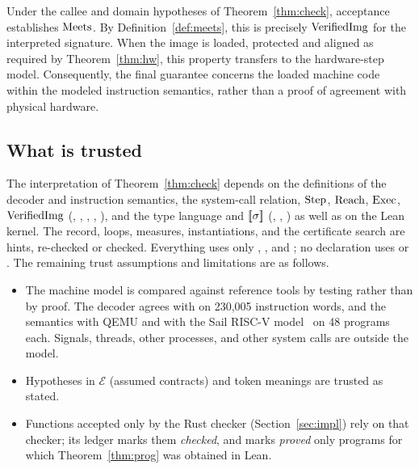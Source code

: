 Under the callee and domain hypotheses of Theorem~\ref{thm:check}, acceptance establishes $\mathrm{Meets}$. By Definition~\ref{def:meets}, this is precisely $\mathrm{VerifiedImg}$ for the interpreted signature. When the image is loaded, protected and aligned as required by Theorem~\ref{thm:hw}, this property transfers to the hardware-step model. Consequently, the final guarantee concerns the loaded machine code within the modeled instruction semantics, rather than a proof of agreement with physical hardware.

\subsection{What is trusted}
The interpretation of Theorem~\ref{thm:check} depends on the definitions of the decoder and instruction semantics, the system-call relation, $\mathrm{Step}$, $\mathrm{Reach}$, $\mathrm{Exec}$, $\mathrm{VerifiedImg}$ (, , , , ), and the type language and $[\![\sigma]\!]$ (, , ) as well as on the Lean kernel. The record, loops, measures, instantiations, and the certificate search are hints, re-checked or checked. Everything uses only , , and ; no declaration uses  or . The remaining trust assumptions and limitations are as follows.
\begin{itemize}
\item The machine model is compared against reference tools by testing rather than by proof. The decoder agrees with  on 230,005 instruction words, and the semantics with QEMU and with the Sail RISC-V model~\cite{sailriscv} on 48 programs each. Signals, threads, other processes, and other system calls are outside the model.
\item Hypotheses in $\mathcal E$ (assumed contracts) and token meanings are trusted as stated.
\item Functions accepted only by the Rust checker (Section~\ref{sec:impl}) rely on that checker; its ledger marks them \emph{checked}, and marks \emph{proved} only programs for which Theorem~\ref{thm:prog} was obtained in Lean.
\end{itemize}

